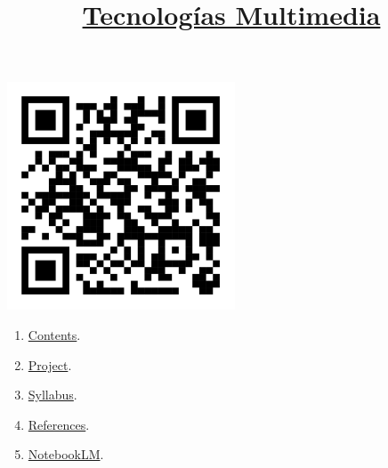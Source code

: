 
%
\title{\href{https://www.ual.es/estudios/grados/presentacion/plandeestudios/asignatura/4015/40154321}{Tecnologías Multimedia}}

\maketitle

\begin{center}
  \includegraphics[width=256px]{TM_codigo_QR.png}
\end{center}

\begin{enumerate}
\item \href{https://tecnologias-multimedia.github.io/contents}{Contents}.
\item \href{https://github.com/Tecnologias-Multimedia/InterCom}{Project}.
\item \href{https://tecnologias-multimedia.github.io/syllabus}{Syllabus}.
\item \href{https://tecnologias-multimedia.github.io/references}{References}.
\item \href{https://notebooklm.google.com/notebook/abba1c7d-f2a3-481b-8864-52a134103aa7}{NotebookLM}.
\end{enumerate}
